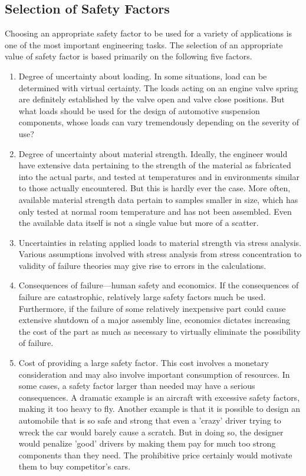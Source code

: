 \documentclass[a4paper,openany,12pt]{book}
\begin{document}
\subsection{Selection of Safety Factors}
\label{selection-of-safety-factors}
Choosing an appropriate safety factor to be used for a variety of
applications is one of the most important engineering tasks. The
selection of an appropriate value of safety factor is based primarily on
the following five factors.

\begin{enumerate}
\item Degree of uncertainty about loading. In some situations, load can be
determined with virtual certainty. The loads acting on an engine
valve spring are definitely established by the valve open and valve
close positions. But what loads should be used for the design of
automotive suspension components, whose loads can vary tremendously
depending on the severity of use?

\item Degree of uncertainty about material strength. Ideally, the engineer
would have extensive data pertaining to the strength of the material
as fabricated into the actual parts, and tested at temperatures and
in environments similar to those actually encountered. But this is
hardly ever the case. More often, available material strength data
pertain to samples smaller in size, which has only tested at normal
room temperature and has not been assembled. Even the available data
itself is not a single value but more of a scatter.

\item Uncertainties in relating applied loads to material strength via
stress analysis. Various assumptions involved with stress analysis
from stress concentration to validity of failure theories may give
rise to errors in the calculations.

\item Consequences of failure---human safety and economics. If the
consequences of failure are catastrophic, relatively large safety
factors much be used. Furthermore, if the failure of some relatively
inexpensive part could cause extensive shutdown of a major assembly
line, economics dictates increasing the cost of the part as much as
necessary to virtually eliminate the possibility of failure.

\item Cost of providing a large safety factor. This cost involves a
monetary consideration and may also involve important consumption of
resources. In some cases, a safety factor larger than needed may have
a serious consequences. A dramatic example is an aircraft with
excessive safety factors, making it too heavy to fly. Another example
is that it is possible to design an automobile that is so safe and
strong that even a 'crazy' driver trying to wreck the car would
barely cause a scratch. But in doing so, the designer would penalize
'good' drivers by making them pay for much too strong components than
they need. The prohibitive price certainly would motivate them to buy
competitor's cars.


\end{enumerate}
\end{document}
